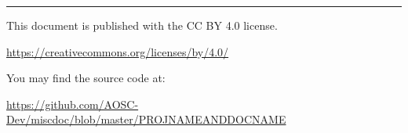 \finalizedocument

\newcommand{\safelink}[1]{
    \href{#1}{\textcolor{black!75}{#1}}
}


\clearpage
\hspace{1mm}
\vfill\par
\begin{minipage}{\linewidth}
    \sffamily
    \linespread{1.5}
    \color{black!75}\raggedright\fontsize{9pt}{10pt}\selectfont
    \hrule
    \vspace{10pt}

    This document is published with the CC BY 4.0 license.
    
    \safelink{https://creativecommons.org/licenses/by/4.0/}

    You may find the source code at:

    \safelink{https://github.com/AOSC-Dev/miscdoc/blob/master/PROJNAMEANDDOCNAME}
\end{minipage}



